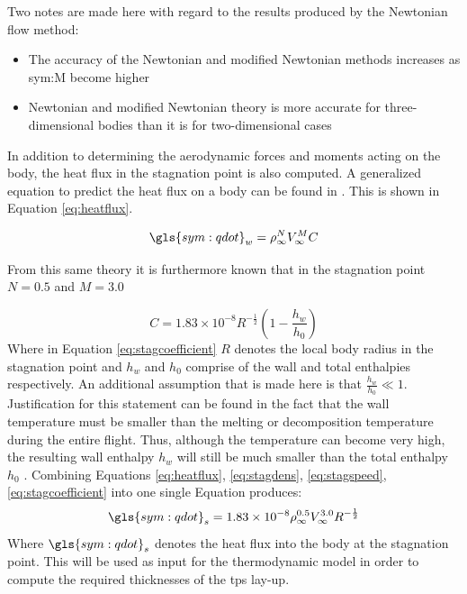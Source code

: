 Two notes are made here with regard to the results produced by the Newtonian flow method:
\begin{itemize}
	\item The accuracy of the Newtonian and modified Newtonian methods increases as \gls{sym:M} become higher \cite{AndersonJr.2007,Bertin1994}
	\item Newtonian and modified Newtonian theory is more accurate for three-dimensional bodies than it is for two-dimensional cases \cite{AndersonJr.2007}
\end{itemize}

In addition to determining the aerodynamic forces and moments acting on the body, the heat flux in the stagnation point is also computed. A generalized equation to predict the heat flux on a body can be found in \cite{AndersonJr.2006,Tauber1986}. This is shown in Equation \ref{eq:heatflux}.

\begin{equation}
\gls{sym:qdot}_w=\rho_{\infty}^{N}V_{\infty}^{M}C
\label{eq:heatflux}
\end{equation}

From this same theory it is furthermore known that in the stagnation point $N=0.5$ and $M=3.0$

\begin{equation}
\label{eq:stagcoefficient}
C=1.83 \times 10^{-8} R^{-\frac{1}{2}}\left(1-\frac{h_{w}}{h_{0}}\right)
\end{equation}
Where in Equation \ref{eq:stagcoefficient} $R$ denotes the local body radius in the stagnation point and $h_{w}$ and $h_{0}$ comprise of the wall and total enthalpies respectively. An additional assumption that is made here is that $\frac{h_{w}}{h_{0}}\ll 1$. Justification for this statement can be found in the fact that the wall temperature must be smaller than the melting or decomposition temperature during the entire flight. Thus, although the temperature can become very high, the resulting wall enthalpy $h_{w}$ will still be much smaller than the total enthalpy $h_{0}$ \cite[p.347]{AndersonJr.2006}. %
Combining Equations \ref{eq:heatflux}, \ref{eq:stagdens}, \ref{eq:stagspeed}, \ref{eq:stagcoefficient} into one single Equation produces:
\begin{equation}
\gls{sym:qdot}_s=1.83 \times 10^{-8}\rho_{\infty}^{0.5} V_{\infty}^{3.0} R^{-\frac{1}{2}}
\label{eq:qstag}
\end{equation}
Where $\gls{sym:qdot}_s$ denotes the heat flux into the body at the stagnation point. This will be used as input for the thermodynamic model in order to compute the required thicknesses of the \acrfull{tps} lay-up.

